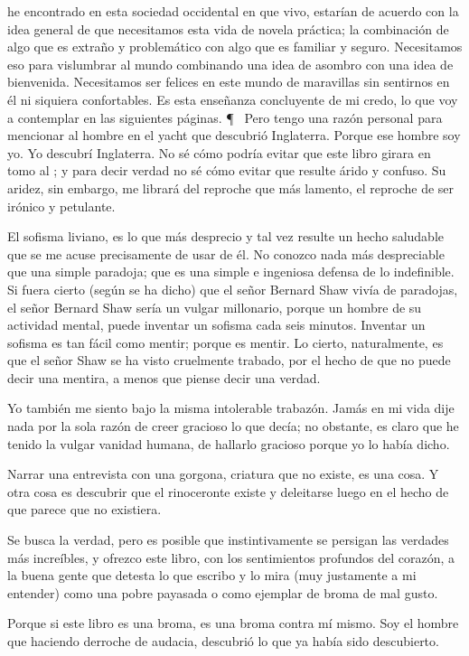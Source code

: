 he encontrado en esta sociedad occidental en que vivo, estarían de acuerdo con la idea general de que
necesitamos esta vida de novela práctica; la combinación de algo que es extraño y problemático con algo
que es familiar y seguro. Necesitamos eso para vislumbrar al mundo combinando una idea de asombro
con una idea de bienvenida. Necesitamos ser felices en este mundo de maravillas sin sentirnos en él ni
siquiera confortables. Es esta enseñanza concluyente de mi credo, lo que voy a contemplar en las
siguientes páginas.
\P~
Pero tengo una razón personal para mencionar al hombre en el yacht que descubrió Inglaterra.
Porque ese hombre soy yo. Yo descubrí Inglaterra.
No sé cómo podría evitar que este libro girara en tomo al ; y para decir verdad no sé cómo
evitar que resulte árido y confuso.
Su aridez, sin embargo, me librará del reproche que más lamento, el reproche de ser irónico y
petulante.

El sofisma liviano, es lo que más desprecio y tal vez resulte un hecho saludable que se me acuse
precisamente de usar de él. No conozco nada más despreciable que una simple paradoja; que es una
simple e ingeniosa defensa de lo indefinible. Si fuera cierto (según se ha dicho) que el señor Bernard
Shaw vivía de paradojas, el señor Bernard Shaw sería un vulgar millonario, porque un hombre de su
actividad mental, puede inventar un sofisma cada seis minutos. Inventar un sofisma es tan fácil como
mentir; porque es mentir. Lo cierto, naturalmente, es que el señor Shaw se ha visto cruelmente trabado,
por el hecho de que no puede decir una mentira, a menos que piense decir una verdad.

Yo también me siento bajo la misma intolerable trabazón. Jamás en mi vida dije nada por la sola
razón de creer gracioso lo que decía; no obstante, es claro que he tenido la vulgar vanidad humana, de
hallarlo gracioso porque yo lo había dicho.

Narrar una entrevista con una gorgona, criatura que no existe, es una cosa. Y otra cosa es descubrir
que el rinoceronte existe y deleitarse luego en el hecho de que parece que no existiera.

Se busca la verdad, pero es posible que instintivamente se persigan las verdades más increíbles, y
ofrezco este libro, con los sentimientos profundos del corazón, a la buena gente que detesta lo que escribo
y lo mira (muy justamente a mi entender) como una pobre payasada o como ejemplar de broma de mal
gusto.

Porque si este libro es una broma, es una broma contra mí mismo. Soy el hombre que haciendo
derroche de audacia, descubrió lo que ya había sido descubierto.

